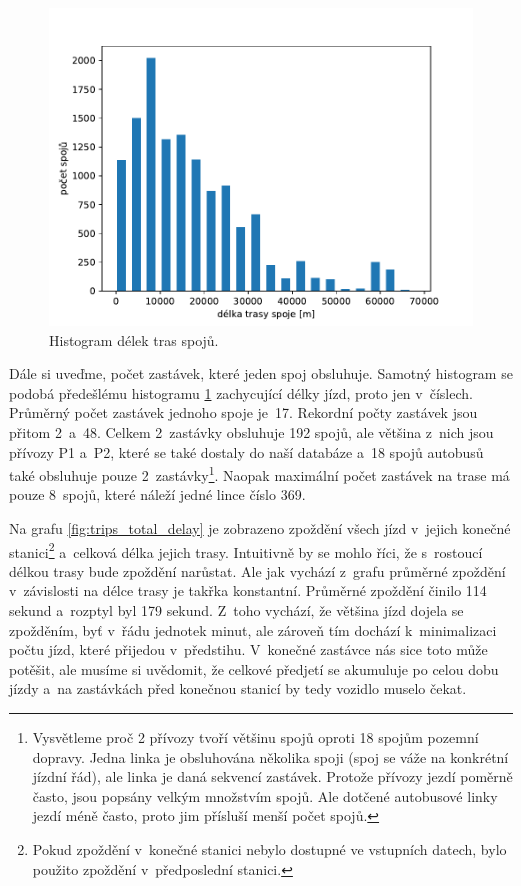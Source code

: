 \begin{figure}
   \centering
 \includegraphics[width=1\linewidth]{../img/trips_len}
 \caption{Histogram délek tras spojů.}
 \label{fig:trips_len}
\end{figure}


\bigbreak

Dále si uveďme, počet zastávek, které jeden spoj obsluhuje. Samotný histogram se podobá předešlému histogramu \ref{fig:trips_len} zachycující délky jízd, proto jen v~číslech. Průměrný počet zastávek jednoho spoje je~17. Rekordní počty zastávek jsou přitom 2~a~48. Celkem 2~zastávky obsluhuje 192 spojů, ale většina z~nich jsou přívozy P1 a~P2, které se také dostaly do naší databáze a~18 spojů autobusů také obsluhuje pouze 2~zastávky\footnote{Vysvětleme proč 2 přívozy tvoří většinu spojů oproti 18 spojům pozemní dopravy. Jedna linka je obsluhována několika spoji (spoj se váže na konkrétní jízdní řád), ale linka je daná sekvencí zastávek. Protože přívozy jezdí poměrně často, jsou popsány velkým množstvím spojů. Ale dotčené autobusové linky jezdí méně často, proto jim přísluší menší počet spojů.}. Naopak maximální počet zastávek na trase má pouze 8~spojů, které náleží jedné lince číslo 369.


\bigbreak


Na grafu \ref{fig:trips_total_delay} je zobrazeno zpoždění všech jízd v~jejich konečné stanici\footnote{Pokud zpoždění v~konečné stanici nebylo dostupné ve vstupních datech, bylo použito zpoždění v~předposlední stanici.} a~celková délka jejich trasy. Intuitivně by se mohlo říci, že s~rostoucí délkou trasy bude zpoždění narůstat. Ale jak vychází z~grafu průměrné zpoždění v~závislosti na délce trasy je takřka konstantní. Průměrné zpoždění činilo 114 sekund a~rozptyl byl 179 sekund. Z~toho vychází, že většina jízd dojela se zpožděním, byť v~řádu jednotek minut, ale zároveň tím dochází k~minimalizaci počtu jízd, které přijedou v~předstihu. V~konečné zastávce nás sice toto může potěšit, ale musíme si uvědomit, že celkové předjetí se akumuluje po celou dobu jízdy a~na zastávkách před konečnou stanicí by tedy vozidlo muselo čekat.


